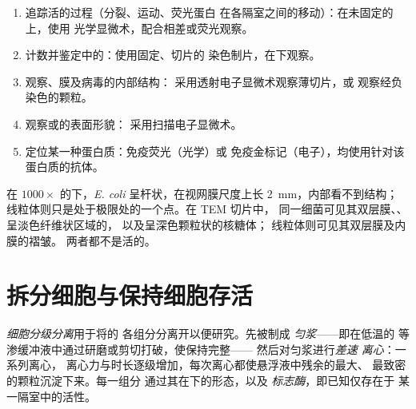 \begin{method}[选择仪器]\label{met:b1:cell-unit-of-life:choose}
\begin{enumerate}
  \item 追踪活的过程（分裂、运动、荧光蛋白
        在各隔室之间的移动）：在未固定的上，使用
        光学显微术，配合相差或荧光观察。
  \item 计数并鉴定中的：使用固定、切片的
        染色制片，在下观察。
  \item 观察、膜及病毒的内部结构：
        采用透射电子显微术观察薄切片，或
        观察经负染色的颗粒。
  \item 观察或的表面形貌：
        采用扫描电子显微术。
  \item 定位某一种蛋白质：免疫荧光（光学）或
        免疫金标记（电子），均使用针对该蛋白质的抗体。
\end{enumerate}
\end{method}

\begin{example}[一个细菌与一个线粒体]\label{ex:b1:cell-unit-of-life:seeing}
在 $1000\times$ 的下，\emph{E. coli} 
呈杆状，在视网膜尺度上长 \qty{2}{mm}，内部看不到结构；
线粒体则只是处于极限处的一个点。在 TEM 切片中，
同一细菌可见其双层膜、、呈淡色纤维状区域的，
以及呈深色颗粒状的核糖体；
线粒体则可见其双层膜及内膜的褶皱。
两者都不是活的。
\end{example}

\section{拆分细胞与保持细胞存活}

\begin{definition}[细胞分级分离]\label{def:b1:cell-unit-of-life:fractionation}
\emph{细胞分级分离}用于将的
各组分分离开以便研究。先被制成
\emph{匀浆}——即在低温的
等渗缓冲液中通过研磨或剪切打破，使保持完整——
然后对匀浆进行\emph{差速
离心}：一系列离心，
离心力与时长逐级增加，每次离心都使悬浮液中残余的最大、
最致密的颗粒沉淀下来。每一组分
通过其在下的形态，以及
\emph{标志酶}，即已知仅存在于
某一隔室中的活性。
\end{definition}

